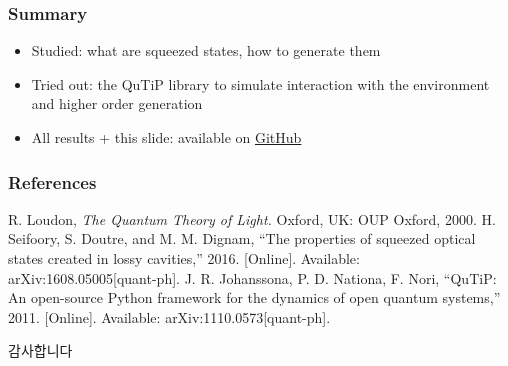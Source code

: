 \documentclass{beamer}
\begin{document}
\begin{frame}[c]
  \frametitle{Summary}
  \begin{itemize}
     \item Studied: what are squeezed states, how to generate them
     \item Tried out: the QuTiP library to simulate interaction with the environment and higher order generation
     \item All results + this slide: available on \href{https://github.com/LimitEpsilon/quantum_sim}{GitHub}
  \end{itemize}
\end{frame}

\begin{frame}[c]
\frametitle{References}
\footnotesize{
\begin{thebibliography}{99} %
 R. Loudon, \textit{The Quantum Theory of Light.} Oxford, UK: OUP Oxford, 2000.
 H. Seifoory, S. Doutre, and M. M. Dignam, ``The properties of squeezed optical states created in lossy cavities,'' 2016. [Online]. Available: arXiv:1608.05005[quant-ph].
 J. R. Johanssona, P. D. Nationa, F. Nori, ``QuTiP: An open-source Python framework for the dynamics of open quantum
systems,'' 2011. [Online]. Available: arXiv:1110.0573[quant-ph].
\end{thebibliography}
}
\end{frame}

\begin{frame}[c]
  \centering\LARGE
  감사합니다\\[\baselineskip]
\end{frame}
\end{document}
